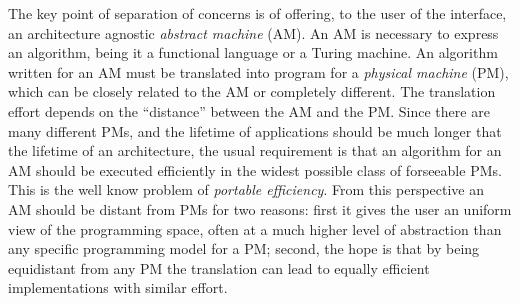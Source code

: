 The key point of separation of concerns is of offering, to the user of
the interface, an architecture agnostic {\em abstract machine}
(AM). An AM is necessary to express an algorithm, being it a
functional language or a Turing machine. An algorithm written for an
AM must be translated into program for a {\em physical machine} (PM),
which can be closely related to the AM or completely different. The
translation effort depends on the ``distance'' between the AM and the
PM. Since there are many different PMs, and the lifetime of
applications should be much longer that the lifetime of an
architecture, the usual requirement is that an algorithm for an AM should
be executed efficiently in the widest possible class of forseeable
PMs. This is the well know problem of {\em portable efficiency}. From
this perspective an AM should be distant from PMs for two reasons:
first it gives the user an uniform view of the programming space,
often at a much higher level of abstraction than any specific
programming model for a PM; second, the hope is that by being
equidistant from any PM the translation can lead to equally efficient
implementations with similar effort.


